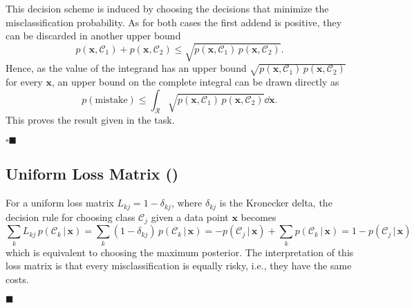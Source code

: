 \documentclass[11pt, a4paper]{scrartcl}
\renewcommand{\vec}[1]{\bm{#1}}
\newcommand{\given}{\,\vert\,}
\newcommand{\eot}{\hfill\(\blacksquare\)}
\newcommand{\qedeot}{\hfill\(\square\blacksquare\)}
\newcommand{\diffstar}{\texorpdfstring{\raisebox{-1pt}{\resizebox{!}{8pt}{\(\star\)}}}{*}}
\newcommand{\onestar}  {(\diffstar)}
\begin{document}
			This decision scheme is induced by choosing the decisions that minimize the misclassification probability. As for both cases the first addend is positive, they can be discarded in another upper bound
			\begin{equation}
				p(\vec{x}, \mathcal{C}_1) + p(\vec{x}, \mathcal{C}_2) \leq \sqrt{p(\vec{x}, \mathcal{C}_1) \, p(\vec{x}, \mathcal{C}_2)}.
			\end{equation}
			Hence, as the value of the integrand has an upper bound \(\sqrt{p(\vec{x}, \mathcal{C}_1) \, p(\vec{x}, \mathcal{C}_2)} \) for every \(\vec{x}\), an upper bound on the complete integral can be drawn directly as
			\begin{equation}
				p(\mathrm{mistake}) \leq \int_{\mathcal{R}}\! \sqrt{p(\vec{x}, \mathcal{C}_1) \, p(\vec{x}, \mathcal{C}_2)} \dd{\vec{x}}.
			\end{equation}
			This proves the result given in the task.

			\qedeot

		\subsection{Uniform Loss Matrix  \onestar}
			\label{subsec:1-22-uniform-loss}

			For a uniform loss matrix \( L_{kj} = 1 - \delta_{kj} \), where \( \delta_{kj} \) is the Kronecker delta, the decision rule for choosing class \(\mathcal{C}_j\) given a data point \(\vec{x}\) becomes
			\begin{equation}
				\sum_k L_{kj} \, p(\mathcal{C}_k \given \vec{x})
					= \sum_k (1 - \delta_{kj}) \, p(\mathcal{C}_k \given \vec{x})
					= -p(\mathcal{C}_j \given \vec{x}) + \sum_k p(\mathcal{C}_k \given \vec{x})
					= 1 - p(\mathcal{C}_j \given \vec{x})
			\end{equation}
			which is equivalent to choosing the maximum posterior. The interpretation of this loss matrix is that every misclassification is equally risky, i.e., they have the same costs.

			\eot
\end{document}
